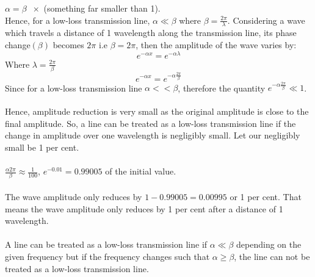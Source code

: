 $\alpha = \beta \;\; \times$ (something far smaller than 1).\\
Hence, for a low-loss transmission line, $\alpha \ll \beta$ where $\beta = \frac{2 \pi}{\lambda}$.
Considering a wave which travels a distance of 1 wavelength along the transmission line, its phase change$(\beta)$ becomes $2\pi$ i.e $\beta= 2 \pi$, then the amplitude of the wave varies by:
\begin{equation*}
e^{-\alpha x} = e^{-\alpha \lambda}	
\end{equation*}
Where $\lambda = \frac{2 \pi}{\beta}$
\begin{equation*}
e^{- \alpha x} = e^{-\alpha \frac{2 \pi}{\beta}}
\end{equation*}
Since for a low-loss transmission line $\alpha<<\beta$, therefore the quantity $e^{-\alpha \frac{2 \pi}{\beta}} \ll 1$.\\\\
Hence, amplitude reduction is very small as the original amplitude is close to the final amplitude. So, a line can be treated as a low-loss transmission line if the change in amplitude over one wavelength is negligibly small. Let our negligibly small be 1 per cent.\\\\ 
$\frac{\alpha 2 \pi}{\beta} \approx \frac{1}{100}$, $ e^{-0.01} = 0.99005$ of the initial value.\\\\
The wave amplitude only reduces by $1-0.99005=0.00995$ or 1 per cent. That means the wave amplitude only reduces by 1 per cent after a distance of 1 wavelength.\\\\
A line can be treated as a low-loss transmission line if $\alpha \ll \beta$ depending on the given frequency but if the frequency changes such that $\alpha \geq \beta$, the line can not be treated as a low-loss transmission line.\\

